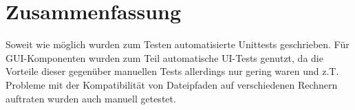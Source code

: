 \chapter{Zusammenfassung}
Soweit wie möglich wurden zum Testen automatisierte Unittests geschrieben. Für GUI-Komponenten wurden zum Teil automatische UI-Tests genutzt, da die Vorteile dieser gegenüber manuellen Tests allerdings nur gering waren und z.T. Probleme mit der Kompatibilität von Dateipfaden auf verschiedenen Rechnern auftraten wurden auch manuell getestet.
